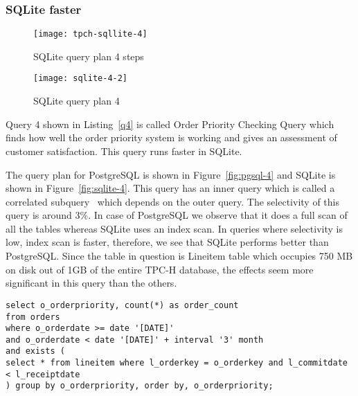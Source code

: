 \subsubsection{SQLite faster}


\begin{figure*}[ht]
\centering
     \begin{subfigure}[b]{0.4\textwidth}
         \centering
         \texttt{[image: tpch-sqllite-4]}
         \caption{SQLite query plan 4 steps}
         \label{fig:tpch-sqllite-4}
     \end{subfigure}
     \hfill
     \begin{subfigure}[b]{0.4\textwidth}
         \centering
         \texttt{[image: sqlite-4-2]}
         \caption{SQLite query plan 4}
         \label{fig:sqlite-4-2}
     \end{subfigure}

        \caption{SQLite plan for query 4}
        \label{fig:sqlite-4}
\end{figure*}
Query 4 shown in Listing~\ref{q4} is called Order Priority Checking Query which finds how well the order priority system is working and gives an assessment of customer satisfaction. This query runs faster in SQLite.

The query plan for PostgreSQL is shown in Figure~\ref{fig:pgsql-4} and SQLite is shown in Figure~\ref{fig:sqlite-4}. This query has an inner query which is called a correlated subquery~\cite{ref:sqlite1} which depends on the outer query. The selectivity of this query is around 3\%. In case of PostgreSQL we observe that it does a full scan of all the tables whereas SQLite uses an index scan. In queries where selectivity is low, index scan is faster, therefore, we see that SQLite performs better than PostgreSQL. Since the table in question is Lineitem table which occupies 750 MB on disk out of 1GB of the entire TPC-H database, the effects seem more significant in this query than the others.\\

\begin{minipage}{\linewidth}
\begin{lstlisting}[breaklines=true, numbers=none, label=q4, caption=Query 4]
select o_orderpriority, count(*) as order_count
from orders
where o_orderdate >= date '[DATE]'
and o_orderdate < date '[DATE]' + interval '3' month
and exists (
select * from lineitem where l_orderkey = o_orderkey and l_commitdate < l_receiptdate
) group by o_orderpriority, order by, o_orderpriority;
\end{lstlisting}
\end{minipage}






